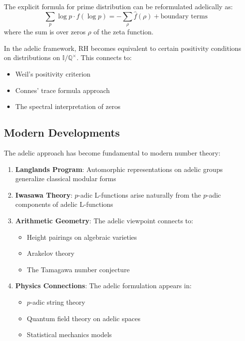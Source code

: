 \begin{theorem}
The explicit formula for prime distribution can be reformulated adelically as:
\begin{equation}
\sum_p \log p \cdot f(\log p) = -\sum_{\rho} \hat{f}(\rho) + \text{boundary terms}
\end{equation}
where the sum is over zeros $\rho$ of the zeta function.
\end{theorem}

\begin{remark}
In the adelic framework, RH becomes equivalent to certain positivity conditions on distributions on $\mathbb{I}/\mathbb{Q}^{\times}$. This connects to:
\begin{itemize}
\item Weil's positivity criterion
\item Connes' trace formula approach
\item The spectral interpretation of zeros
\end{itemize}
\end{remark}

\subsection{Modern Developments}

The adelic approach has become fundamental to modern number theory:

\begin{enumerate}
\item \textbf{Langlands Program}: Automorphic representations on adelic groups generalize classical modular forms

\item \textbf{Iwasawa Theory}: $p$-adic L-functions arise naturally from the $p$-adic components of adelic L-functions

\item \textbf{Arithmetic Geometry}: The adelic viewpoint connects to:
   \begin{itemize}
   \item Height pairings on algebraic varieties
   \item Arakelov theory
   \item The Tamagawa number conjecture
   \end{itemize}

\item \textbf{Physics Connections}: The adelic formulation appears in:
   \begin{itemize}
   \item $p$-adic string theory
   \item Quantum field theory on adelic spaces
   \item Statistical mechanics models
   \end{itemize}
\end{enumerate}

